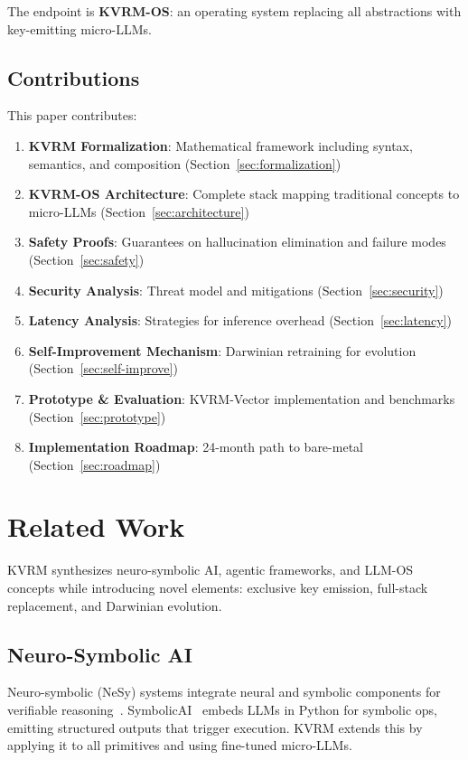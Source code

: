 \documentclass[11pt,a4paper]{article}
\begin{document}
The endpoint is \textbf{KVRM-OS}: an operating system replacing all abstractions with key-emitting micro-LLMs.

\subsection{Contributions}

This paper contributes:
\begin{enumerate}
    \item \textbf{KVRM Formalization}: Mathematical framework including syntax, semantics, and composition (Section~\ref{sec:formalization})
    \item \textbf{KVRM-OS Architecture}: Complete stack mapping traditional concepts to micro-LLMs (Section~\ref{sec:architecture})
    \item \textbf{Safety Proofs}: Guarantees on hallucination elimination and failure modes (Section~\ref{sec:safety})
    \item \textbf{Security Analysis}: Threat model and mitigations (Section~\ref{sec:security})
    \item \textbf{Latency Analysis}: Strategies for inference overhead (Section~\ref{sec:latency})
    \item \textbf{Self-Improvement Mechanism}: Darwinian retraining for evolution (Section~\ref{sec:self-improve})
    \item \textbf{Prototype \& Evaluation}: KVRM-Vector implementation and benchmarks (Section~\ref{sec:prototype})
    \item \textbf{Implementation Roadmap}: 24-month path to bare-metal (Section~\ref{sec:roadmap})
\end{enumerate}

\section{Related Work}

KVRM synthesizes neuro-symbolic AI, agentic frameworks, and LLM-OS concepts while introducing novel elements: exclusive key emission, full-stack replacement, and Darwinian evolution.

\subsection{Neuro-Symbolic AI}

Neuro-symbolic (NeSy) systems integrate neural and symbolic components for verifiable reasoning~\cite{garcez2020neurosymbolic}. SymbolicAI~\cite{extensity2024symbolicai} embeds LLMs in Python for symbolic ops, emitting structured outputs that trigger execution. KVRM extends this by applying it to all primitives and using fine-tuned micro-LLMs.
\end{document}
